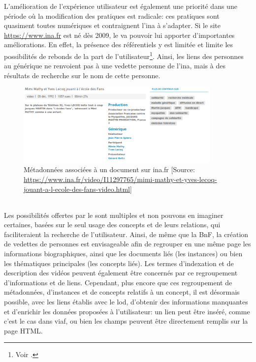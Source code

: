 L'amélioration de l'expérience utilisateur est également une priorité dans une période où la modification des pratiques est radicale: ces pratiques sont quasiment toutes numériques et contraignent l'\ac{ina} à s'adapter. Si le site \url{https://www.ina.fr} est né dès 2009, le \ldd va pouvoir lui apporter d'importantes améliorations. En effet, la présence des référentiels y est limitée et limite les possibilités de rebonds de la part de l'utilisateur\footnote{Voir .}. Ainsi, les liens des personnes au générique ne renvoient pas à une vedette personne de l'\ac{ina}, mais à des résultats de recherche sur le nom de cette personne. 
\begin{figure}[!h]
	\centering
	\includegraphics[width=10cm]{images/inafr_ecole_fans.png}
	\caption[Métadonnées associées à un document sur ina.fr]{Métadonnées associées à un document sur ina.fr [Source: \url{https://www.ina.fr/video/I11297765/mimi-mathy-et-yves-lecoq-jouant-a-l-ecole-des-fans-video.html}]}
	\label{inafr_result}
\end{figure}\\
Les possibilités offertes par le \ldd sont multiples et non pouvons en imaginer certaines, basées sur le seul usage des concepts et de leurs relations, qui faciliteraient la recherche de l'utilisateur. Ainsi, de même que la BnF, la création de vedettes de personnes est envisageable afin de regrouper en une même page les informations biographiques, ainsi que les documents liés (les instances) ou bien les thématiques principales (les concepts liés). Les termes d'indexation et de description des vidéos peuvent également être concernés par ce regroupement d'informations et de liens. Cependant, plus encore que ces regroupement de métadonnées, d'instances et de concepts relatifs à un concept, il est désormais possible, avec les liens établis avec le \ac{lod}, d'obtenir des informations manquantes et d'enrichir les données proposées à l'utilisateur: un lien peut être inséré, comme c'est le cas dans \ac{viaf}, ou bien les champs peuvent être directement remplis sur la page HTML.\\

